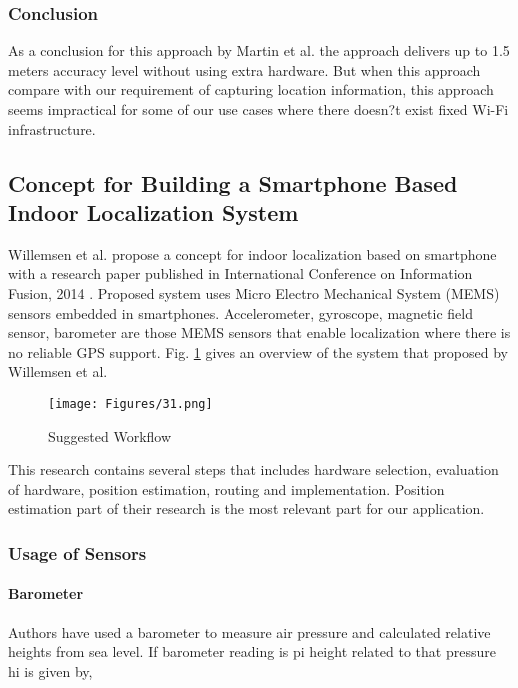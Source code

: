 \subsubsection{Conclusion}
As a conclusion for this approach by Martin et al. the approach delivers up to 1.5 meters accuracy level without using extra hardware. But when this approach compare with our requirement of capturing location information, this approach seems impractical for some of our use cases where there doesn?t exist fixed Wi-Fi infrastructure.

\subsection{Concept for Building a Smartphone Based Indoor Localization System}
Willemsen et al. propose a concept for indoor localization based on smartphone with a research paper published in International Conference on Information Fusion, 2014 \cite{49}. Proposed system uses Micro Electro Mechanical System (MEMS) sensors embedded in smartphones. Accelerometer, gyroscope, magnetic field sensor, barometer are those MEMS sensors that enable localization where there is no reliable GPS support. Fig. \ref{fig2_workflow} gives an overview of the system that proposed by Willemsen et al.

\begin{figure}[htbp]
\begin{center}
\texttt{[image: Figures/31.png]}
\caption{Suggested Workflow}
\label{fig2_workflow}
\end{center}
\end{figure}

This research contains several steps that includes hardware selection, evaluation of hardware, position estimation, routing and implementation. Position estimation part of their research is the most relevant part for our application.

\subsubsection{Usage of Sensors}

\paragraph{\textbf{Barometer}}
Authors have used a barometer to measure air pressure and calculated relative heights from sea level. If barometer reading is pi height related to that pressure hi is given by,

